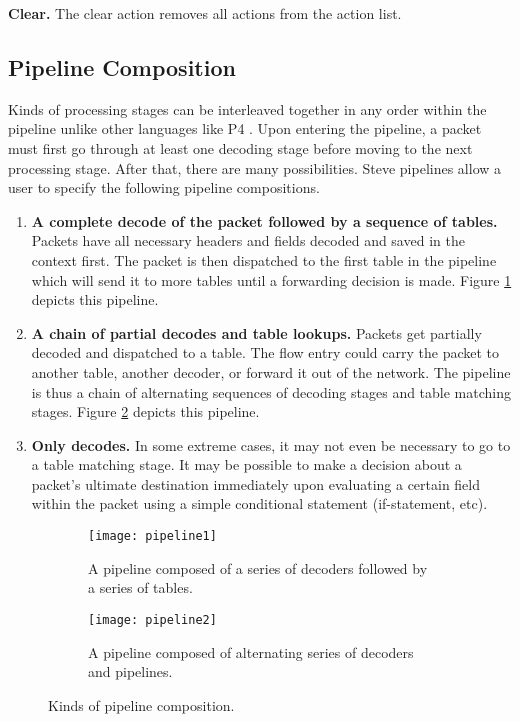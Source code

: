 \textbf{Clear.} The clear action removes all actions from the action list.

\subsection{Pipeline Composition} \label{pipeline_comp_desc}

Kinds of processing stages can be interleaved together in any order within the
pipeline unlike other languages like P4 \cite{p42014, p4_spec}. 
Upon entering the pipeline, a packet must first go through at least one decoding
stage before moving to the next processing stage. After that, there are many
possibilities.
Steve pipelines allow a user to specify the following pipeline compositions.

\begin{enumerate} 
\item \textbf{A complete decode of the packet followed by a
sequence of tables.} Packets have all necessary headers and fields decoded and
saved in the context first. The packet is then dispatched to the first table in
the pipeline which will send it to more tables until a forwarding decision is made.
Figure \ref{fg:pipeline1} depicts this pipeline.

\item \textbf{A chain of partial decodes and table lookups.} Packets get
partially decoded and dispatched to a table. The flow entry could carry the
packet to another table, another decoder, or forward it out of the network. The
pipeline is thus a chain of alternating sequences of decoding stages and table
matching stages. 
Figure \ref{fg:pipeline2} depicts this pipeline.

\item \textbf{Only decodes.} In some extreme cases, it may not
even be necessary to go to a table matching stage. It may be possible to make a
decision about a packet’s ultimate destination immediately upon evaluating a
certain field within the packet using a simple conditional statement
(if-statement, etc).
\end{enumerate}

\begin{figure}
\begin{subfigure}[t]{\linewidth}
  \centering
  \texttt{[image: pipeline1]}
  \caption{A pipeline composed of a series of decoders followed by a series
  of tables.}
  \label{fg:pipeline1}
\end{subfigure}
\hfill
\begin{subfigure}[t]{0.95\linewidth}
  \centering
  \texttt{[image: pipeline2]}
  \caption{A pipeline composed of alternating series of decoders and pipelines.}
  \label{fg:pipeline2}
\end{subfigure}

\caption{Kinds of pipeline composition.}
\label{fg:pipeline_comp}
\end{figure}

